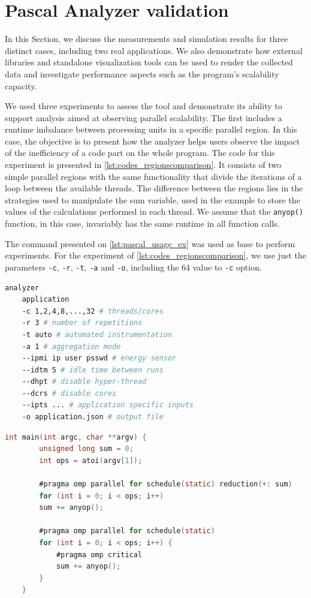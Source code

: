 \section{Pascal Analyzer validation} \label{sec:pascal_framework_validation}
In this Section, we discuss the measurements and simulation results for three distinct cases, including two real applications. We also demonstrate how external libraries and standalone visualization tools can be used to render the collected data and investigate performance aspects such as the program's scalability capacity.

We used three experiments to assess the tool and demonstrate its ability to support analysis aimed at observing parallel scalability. The first includes a runtime imbalance between processing units in a specific parallel region. In this case, the objective is to present how the analyzer helps users observe the impact of the inefficiency of a code part on the whole program. The code for this experiment is presented in \cref{lst:codes_regionscomparison}. It consists of two simple parallel regions with the same functionality that divide the iterations of a loop between the available threads. The difference between the regions lies in the strategies used to manipulate the sum variable, used in the example to store the values of the calculations performed in each thread. We assume that the {\tt anyop()} function, in this case, invariably has the same runtime in all function calls.

The command presented on \cref{lst:pascal_usage_ex} was used as base to perform experiments. For the experiment of \cref{lst:codes_regionscomparison}, we use just the parameters {\tt -c}, {\tt -r}, {\tt -t}, {\tt -a} and {\tt -o}, including the 64 value to {\tt -c} option.

\lstset{style=ccodestyle, frame=tb}
\begin{lstlisting}[label={lst:pascal_usage_ex}, language=bash, caption={Command line showing how experiments were run through a terminal.}]
	analyzer 
	application
	-c 1,2,4,8,...,32 # threads/cores
	-r 3 # number of repetitions
	-t auto # automated instrumentation
	-a 1 # aggregation mode
	--ipmi ip user psswd # energy sensor
	--idtm 5 # idle time between runs
	--dhpt # disable hyper-thread
	--dcrs # disable cores
	--ipts ... # application specific inputs
	-o application.json # output file
\end{lstlisting}

\lstset{style=ccodestyle, frame=tb}
\begin{lstlisting}[label={lst:codes_regionscomparison}, language=C, caption={Sample code used to visualize the impact of regions on program scalability.}]
	int main(int argc, char **argv) {
		unsigned long sum = 0;
		int ops = atoi(argv[1]);
		
		#pragma omp parallel for schedule(static) reduction(+: sum)
		for (int i = 0; i < ops; i++)
		sum += anyop();
		
		#pragma omp parallel for schedule(static)
		for (int i = 0; i < ops; i++) {
			#pragma omp critical
			sum += anyop();
		}
	}
\end{lstlisting}

